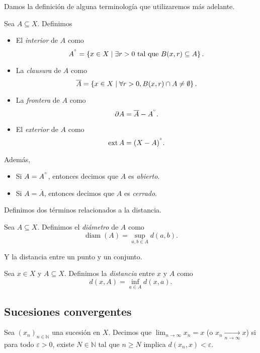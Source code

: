 Damos la definición de alguna terminología que utilizaremos más adelante.

\begin{definition}
    Sea $A \subseteq X$. Definimos
    \begin{itemize}
        \item El \emph{interior} de $A$ como 
        $$
            A^{\degree} = \left\{  x \in X \mid \exists r > 0 \text{ tal que } B(x, r) \subseteq A \right\}.
        $$
        \item La \emph{clausura} de $A$ como
        $$
            \overline{A} = \left\{  x \in X \mid \forall r > 0, B(x, r) \cap A \neq \emptyset \right\}.
        $$
        \item La \emph{frontera} de $A$ como
        $$
            \partial A = \overline{A} - A^{\degree}.
        $$
        \item El \emph{exterior} de $A$ como
        $$
            \operatorname{ext} A = (X - A)^{\degree}.
        $$
    \end{itemize}
    Además, 
    \begin{itemize}
        \item Si $A = A^{\degree}$, entonces decimos que $A$ es \emph{abierto}.
        \item Si $A = \overline{A}$, entonces decimos que $A$ es \emph{cerrado}.
    \end{itemize}
\end{definition}

Definimos dos términos relacionados a la distancia.

\begin{definition}
    Sea $A \subseteq X$. Definimos el \emph{diámetro} de $A$ como
    $$
        \operatorname{diam}(A) = \sup_{a, b \in A} d(a, b).
    $$
\end{definition}

Y la distancia entre un punto y un conjunto.

\begin{definition}
    Sea $x \in X$ y $A \subseteq X$. Definimos la \emph{distancia} entre $x$ y $A$ como
    $$
        d(x, A) = \inf_{a \in A} d(x, a).
    $$
\end{definition}

\subsection{Sucesiones convergentes}

\begin{definition}
    Sea $(x_n)_{n \in \mathbb{N}}$ una sucesión en $X$. Decimos que $\lim_{n \to \infty} x_{n} = x$ (o $x_{n} \xrightarrow[n \to \infty]{} x$) si para todo $\varepsilon > 0$, existe $N \in \mathbb{N}$ tal que $n \geq N$ implica $d(x_n, x) < \varepsilon$.
\end{definition}

